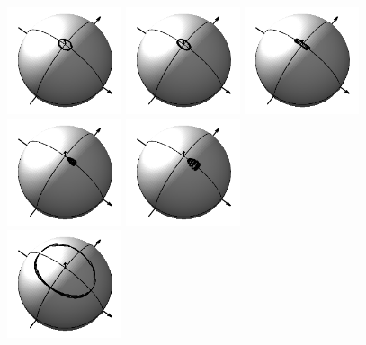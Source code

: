 \begin{figure}[H]
  \centering
	\includegraphics[width=0.3\textwidth]{../pictures/rigid_base/plot_J=10n=0.png}
	\includegraphics[width=0.3\textwidth]{../pictures/rigid_base/plot_J=15n=0.png}
	\includegraphics[width=0.3\textwidth]{../pictures/rigid_base/plot_J=20n=0.png} \\
	\includegraphics[width=0.3\textwidth]{../pictures/rigid_base/plot_J=21n=0.png}
	\includegraphics[width=0.3\textwidth]{../pictures/rigid_base/plot_J=22n=0.png} \\
	\includegraphics[width=0.3\textwidth]{../pictures/rigid_base/plot_J=10n=0theta=75.png}

\end{figure}
